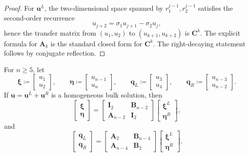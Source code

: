\documentclass[11pt]{article}
\begin{document}
\begin{proof}
For \(\mathbf u^L\), the two-dimensional space spanned by \(r_1^{j-1},r_2^{j-1}\) satisfies the second-order recurrence
\[
u_{j+2}=\sigma_1 u_{j+1}-\sigma_2 u_j,
\]
hence the transfer matrix from \((u_1,u_2)\) to \((u_{k+1},u_{k+2})\) is \(\mathbf C^k\). The explicit formula for \(\mathbf A_k\) is the standard closed form for \(\mathbf C^k\). The right-decaying statement follows by conjugate reflection.
\end{proof}

For \(n\ge 5\), let
\[
\boldsymbol{\xi}\coloneqq
\begin{bmatrix}
u_1\\
u_2
\end{bmatrix},
\qquad
\boldsymbol{\eta}\coloneqq
\begin{bmatrix}
u_{n-1}\\
u_n
\end{bmatrix},
\qquad
\mathbf q_L\coloneqq
\begin{bmatrix}
u_3\\
u_4
\end{bmatrix},
\qquad
\mathbf q_R\coloneqq
\begin{bmatrix}
u_{n-3}\\
u_{n-2}
\end{bmatrix}.
\]
If \(\mathbf u=\mathbf u^L+\mathbf u^R\) is a homogeneous bulk solution, then
\[
\begin{bmatrix}\boldsymbol{\xi}\\ \boldsymbol{\eta}\end{bmatrix}
=
\begin{bmatrix}
\mathbf I_2 & \mathbf B_{n-2}\\
\mathbf A_{n-2} & \mathbf I_2
\end{bmatrix}
\begin{bmatrix}
\boldsymbol{\xi}^L\\
\boldsymbol{\eta}^R
\end{bmatrix},
\]
and
\[
\begin{bmatrix}
\mathbf q_L\\
\mathbf q_R
\end{bmatrix}
=
\begin{bmatrix}
\mathbf A_2 & \mathbf B_{n-4}\\
\mathbf A_{n-4} & \mathbf B_2
\end{bmatrix}
\begin{bmatrix}
\boldsymbol{\xi}^L\\
\boldsymbol{\eta}^R
\end{bmatrix}.
\]
\end{document}
